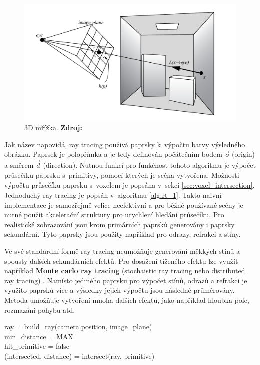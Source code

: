 \begin{figure}[H]
	\centering
	\includegraphics[scale=1]{obrazky-figures/ray_tracing_plane.png}
	\caption{3D mřížka. \textbf{Zdroj: \cite{advanced_global}}}
	\label{fig:3d_grid}
\end{figure}


Jak název napovídá, ray tracing používá paprsky k~výpočtu barvy výsledného obrázku. Paprsek je polopřímka a je tedy definován počátečním bodem $\Vec{o}$ (origin) a směrem $\Vec{d}$ (direction). Nutnou funkcí pro funkčnost tohoto algoritmu je výpočet průsečíku paprsku s~primitivy, pomocí kterých je scéna vytvořena. Možnosti výpočtu průsečíku paprsku s~voxelem je popsána v~sekci \ref{sec:voxel_intersection}. Jednoduchý ray tracing je popsán v~algoritmu \ref{alg:rt_1}. Takto naivní implementace je samozřejmě velice neefektivní a pro běžně používané scény je nutné použít akcelerační struktury pro urychlení hledání průsečíku\cite{accelerated_rt}. Pro realistické zobrazování jsou krom primárních paprsků generovány i paprsky sekundární. Tyto paprsky jsou použity například pro odrazy, refrakci a stíny.

Ve své standardní formě ray tracing neumožňuje generování měkkých stínů a spousty dalších sekundárních efektů.  Pro dosažení tíženého efektu lze využít například \textbf{Monte carlo ray tracing} (stochaistic ray tracing nebo distributed ray tracing) \cite{distributed_rt}. Namísto jediného paprsku pro výpočet stínů, odrazů a refrakcí je využito paprsků více a výsledky jejich výpočtu jsou následně průměrovány. Metoda umožňuje vytvoření mnoha dalších efektů, jako například hloubka pole, rozmazání pohybu atd.

\begin{center}
	\begin{czechalgorithm}[H] \label{alg:rt_1}
		ray = build\_ray(camera.position, image\_plane)\\
		min\_distance = MAX\\
		hit\_primitive = false\\
		 {
			(intersected, distance) = intersect(ray, primitive)\\
		}
		\caption{Ray tracing}
	\end{czechalgorithm}
\end{center}

